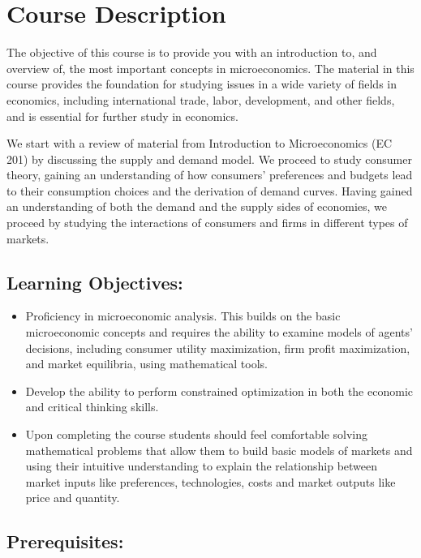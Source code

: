 \section{Course Description}

The objective of this course is to provide you with an introduction to, and overview of, the
most important concepts in microeconomics. The material in this course provides the foundation
for studying issues in a wide variety of fields in economics, including international trade, labor,
development, and other fields, and is essential for further study in economics.

We start with a review of material from Introduction to Microeconomics (EC 201) by discussing
the supply and demand model. We proceed to study consumer theory, gaining an understanding
of how consumers’ preferences and budgets lead to their consumption choices and the derivation
of demand curves. Having gained an understanding of both the demand and the supply sides of
economies, we proceed by studying the interactions of consumers and firms in different types of
markets.

\subsection*{Learning Objectives:}

\begin{itemize}
\item Proficiency in microeconomic analysis.
  This builds on the basic microeconomic concepts and requires the ability to examine models of agents’ decisions, including consumer utility maximization, firm profit maximization, and market equilibria, using mathematical tools.
  \item Develop the ability to perform constrained optimization in both the economic and critical thinking skills.
  \item Upon completing the course students should feel comfortable solving mathematical problems that allow them to build basic models of markets and using their intuitive understanding to explain the relationship between market inputs like preferences, technologies, costs and market outputs like price and quantity.
\end{itemize}

\subsection*{Prerequisites:}


